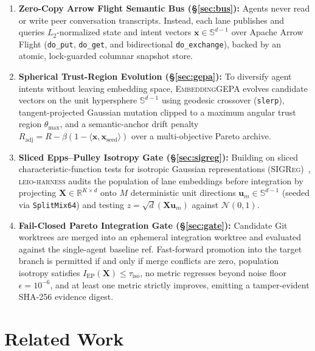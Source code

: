 \documentclass[11pt]{article}
\begin{document}
\begin{enumerate}
    \item \textbf{Zero-Copy Arrow Flight Semantic Bus (\S\ref{sec:bus}):} Agents never read or write peer conversation transcripts. Instead, each lane publishes and queries $L_2$-normalized state and intent vectors $\mathbf{x} \in \mathbb{S}^{d-1}$ over Apache Arrow Flight (\texttt{do\_put}, \texttt{do\_get}, and bidirectional \texttt{do\_exchange}), backed by an atomic, lock-guarded columnar snapshot store.
    \item \textbf{Spherical Trust-Region Evolution (\S\ref{sec:gepa}):} To diversify agent intents without leaving embedding space, \textsc{EmbeddingGEPA} evolves candidate vectors on the unit hypersphere $\mathbb{S}^{d-1}$ using geodesic crossover (\texttt{slerp}), tangent-projected Gaussian mutation clipped to a maximum angular trust region $\theta_{\max}$, and a semantic-anchor drift penalty $R_{\text{adj}} = R - \beta(1 - \langle \mathbf{x}, \mathbf{x}_{\text{seed}}\rangle)$ over a multi-objective Pareto archive.
    \item \textbf{Sliced Epps--Pulley Isotropy Gate (\S\ref{sec:sigreg}):} Building on sliced characteristic-function tests for isotropic Gaussian representations (\textsc{SIGReg})~\cite{epps1983test,klindt2025sigreg}, \textsc{leio-harness} audits the population of lane embeddings before integration by projecting $\mathbf{X} \in \mathbb{R}^{K \times d}$ onto $M$ deterministic unit directions $\mathbf{u}_m \in \mathbb{S}^{d-1}$ (seeded via \texttt{SplitMix64}) and testing $z = \sqrt{d}(\mathbf{X}\mathbf{u}_m)$ against $\mathcal{N}(0,1)$.
    \item \textbf{Fail-Closed Pareto Integration Gate (\S\ref{sec:gate}):} Candidate Git worktrees are merged into an ephemeral integration worktree and evaluated against the single-agent baseline ref. Fast-forward promotion into the target branch is permitted if and only if merge conflicts are zero, population isotropy satisfies $I_{\text{EP}}(\mathbf{X}) \le \tau_{\text{iso}}$, no metric regresses beyond noise floor $\epsilon = 10^{-6}$, and at least one metric strictly improves, emitting a tamper-evident SHA-256 evidence digest.
\end{enumerate}

\section{Related Work}
\end{document}
